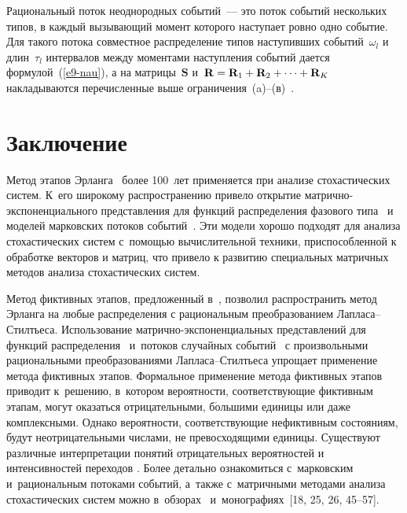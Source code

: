 \begin{multicols}{2}
  Рациональный поток неоднородных событий~--- это поток событий 
нескольких типов, в каждый вызывающий момент которого наступает ровно 
одно событие. Для такого потока совместное распределение типов 
наступивших событий~$\omega_l$ и длин~$\tau_l$ интервалов между 
моментами наступления событий дается формулой~(\ref{e9-nau}), а на 
матрицы~$\mathbf{S}$ 
и~$\mathbf{R}\hm=\mathbf{R}_1\hm+\mathbf{R}_2+\cdots  + \mathbf{R}_K$ 
накладываются перечисленные выше ограничения~(a)--(в)~\cite{32-nau}. 

\section{Заключение}

  Метод этапов Эрланга~\cite{33-nau} более 100~лет применяется при анализе 
стохастических систем. К~его широкому распространению привело открытие  
мат\-рич\-но-экс\-по\-нен\-ци\-аль\-но\-го представления для функций 
распределения фазового типа~\cite{34-nau} и моделей марковских потоков 
событий~\cite{1-nau, 17-nau}. Эти модели хорошо подходят для анализа 
стохастических систем с~по\-мощью вычислительной техники, 
приспособленной к обработке векторов и матриц, что привело к развитию 
специальных матричных методов анализа стохастических систем.
  
  Метод фиктивных этапов, предложенный в~\cite{28-nau}, позволил 
распространить метод Эрланга на любые распределения с рациональным 
преобразованием 
  Лап\-ла\-са--Стилть\-еса. Использование мат\-рич\-но-экс\-по\-нен\-ци\-аль\-ных 
  представлений для функций распределения~\cite{22-nau, 23-nau, 25-nau} 
  и~потоков случайных событий~\cite{31-nau} с произвольными рациональными 
преобразованиями 
  Лап\-ла\-са--Стилть\-еса упрощает применение метода фиктивных этапов. 
Формальное применение метода фиктивных этапов приводит\linebreak 
к~решению, 
в~котором вероятности, со\-от\-вет\-ст\-ву\-ющие фиктивным этапам, могут оказаться 
отрицательными, б$\acute{\mbox{о}}$льшими единицы или даже 
комплекс\-ны\-ми. Однако вероятности, соответствующие \mbox{не\-фик\-тив\-ным} 
состояниям, будут неотрицательными числами, не превосходящими единицы. 
Существуют различные интерпретации понятий отрицательных вероятностей 
и интенсивностей \mbox{переходов} \cite{35-nau, 36-nau, 37-nau, 38-nau}. Более 
детально ознакомиться с~{марковским} и~рациональным потоками событий, 
а~также с~матричными методами анализа стохастических систем можно 
 в~обзорах~\cite{39-nau, 40-nau, 41-nau, 42-nau, 43-nau, 44-nau}  
и~монографиях~[18, 25, 26, 45--57]. 


\end{multicols}
